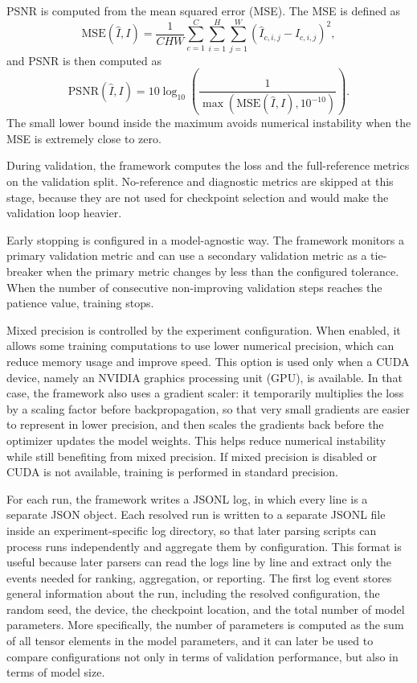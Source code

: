 PSNR is computed from the mean squared error (MSE). The MSE is defined as
\begin{equation}
	\mathrm{MSE}(\hat{I}, I)
	=
	\frac{1}{CHW}
	\sum_{c=1}^{C}
	\sum_{i=1}^{H}
	\sum_{j=1}^{W}
	\left(
	\hat{I}_{c,i,j} - I_{c,i,j}
	\right)^2,
	\label{eq:mse}
\end{equation}
and PSNR is then computed as
\begin{equation}
	\mathrm{PSNR}(\hat{I}, I)
	=
	10 \log_{10}
	\left(
	\frac{1}{\max(\mathrm{MSE}(\hat{I}, I), 10^{-10})}
	\right).
	\label{eq:psnr}
\end{equation}
The small lower bound inside the maximum avoids numerical instability when the MSE is extremely close to zero.

During validation, the framework computes the loss and the full-reference metrics on the validation split. No-reference and diagnostic metrics are skipped at this stage, because they are not used for checkpoint selection and would make the validation loop heavier.

Early stopping is configured in a model-agnostic way. The framework monitors a primary validation metric and can use a secondary validation metric as a tie-breaker when the primary metric changes by less than the configured tolerance. When the number of consecutive non-improving validation steps reaches the patience value, training stops.

Mixed precision is controlled by the experiment configuration. When enabled, it allows some training computations to use lower numerical precision, which can reduce memory usage and improve speed. This option is used only when a CUDA device, namely an NVIDIA graphics processing unit (GPU), is available. In that case, the framework also uses a gradient scaler: it temporarily multiplies the loss by a scaling factor before backpropagation, so that very small gradients are easier to represent in lower precision, and then scales the gradients back before the optimizer updates the model weights. This helps reduce numerical instability while still benefiting from mixed precision. If mixed precision is disabled or CUDA is not available, training is performed in standard precision.

For each run, the framework writes a JSONL log, in which every line is a separate JSON object. Each resolved run is written to a separate JSONL file inside an experiment-specific log directory, so that later parsing scripts can process runs independently and aggregate them by configuration. This format is useful because later parsers can read the logs line by line and extract only the events needed for ranking, aggregation, or reporting. The first log event stores general information about the run, including the resolved configuration, the random seed, the device, the checkpoint location, and the total number of model parameters. More specifically, the number of parameters is computed as the sum of all tensor elements in the model parameters, and it can later be used to compare configurations not only in terms of validation performance, but also in terms of model size.

